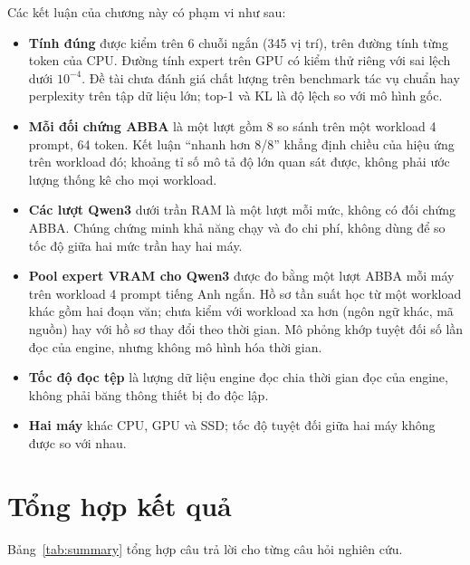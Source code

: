 Các kết luận của chương này có phạm vi như sau:
\begin{itemize}
\item \textbf{Tính đúng} được kiểm trên 6 chuỗi ngắn (345 vị trí), trên đường tính từng token của CPU. Đường tính expert trên GPU có kiểm thử riêng với sai lệch dưới $10^{-4}$. Đề tài chưa đánh giá chất lượng trên benchmark tác vụ chuẩn hay perplexity trên tập dữ liệu lớn; top-1 và KL là độ lệch so với mô hình gốc.
\item \textbf{Mỗi đối chứng ABBA} là một lượt gồm 8 so sánh trên một workload 4 prompt, 64 token. Kết luận ``nhanh hơn 8/8'' khẳng định chiều của hiệu ứng trên workload đó; khoảng tỉ số mô tả độ lớn quan sát được, không phải ước lượng thống kê cho mọi workload.
\item \textbf{Các lượt Qwen3} dưới trần RAM là một lượt mỗi mức, không có đối chứng ABBA. Chúng chứng minh khả năng chạy và đo chi phí, không dùng để so tốc độ giữa hai mức trần hay hai máy.
\item \textbf{Pool expert VRAM cho Qwen3} được đo bằng một lượt ABBA mỗi máy trên workload 4 prompt tiếng Anh ngắn. Hồ sơ tần suất học từ một workload khác gồm hai đoạn văn; chưa kiểm với workload xa hơn (ngôn ngữ khác, mã nguồn) hay với hồ sơ thay đổi theo thời gian. Mô phỏng khớp tuyệt đối số lần đọc của engine, nhưng không mô hình hóa thời gian.
\item \textbf{Tốc độ đọc tệp} là lượng dữ liệu engine đọc chia thời gian đọc của engine, không phải băng thông thiết bị đo độc lập.
\item \textbf{Hai máy} khác CPU, GPU và SSD; tốc độ tuyệt đối giữa hai máy không được so với nhau.
\end{itemize}

\section{Tổng hợp kết quả}

Bảng~\ref{tab:summary} tổng hợp câu trả lời cho từng câu hỏi nghiên cứu.


